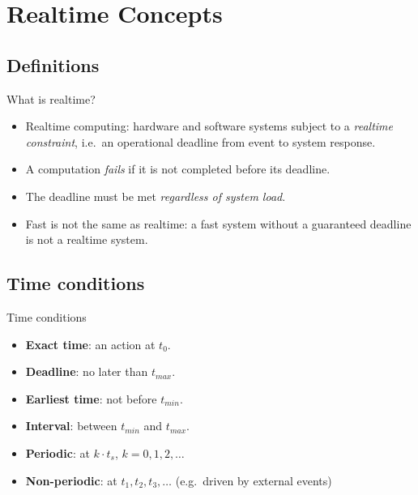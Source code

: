 \section{Realtime Concepts}

\subsection{Definitions}
\begin{frame}{What is realtime?}
  \begin{itemize}
    \item Realtime computing: hardware and software systems subject to a \emph{realtime constraint}, i.e.\ an operational deadline from event to system response.
    \item A computation \emph{fails} if it is not completed before its deadline.
    \item The deadline must be met \emph{regardless of system load}.
    \item Fast is not the same as realtime: a fast system without a guaranteed deadline is not a realtime system.
  \end{itemize}
\end{frame}


\subsection{Time conditions}
\begin{frame}{Time conditions}
  \begin{itemize}
    \item \textbf{Exact time}: an action at $t_0$.
    \item \textbf{Deadline}: no later than $t_{max}$.
    \item \textbf{Earliest time}: not before $t_{min}$.
    \item \textbf{Interval}: between $t_{min}$ and $t_{max}$.
    \item \textbf{Periodic}: at $k\cdot t_s$, $k = 0,1,2,\dots$
    \item \textbf{Non-periodic}: at $t_1, t_2, t_3,\dots$ (e.g.\ driven by external events)
  \end{itemize}
\end{frame}

